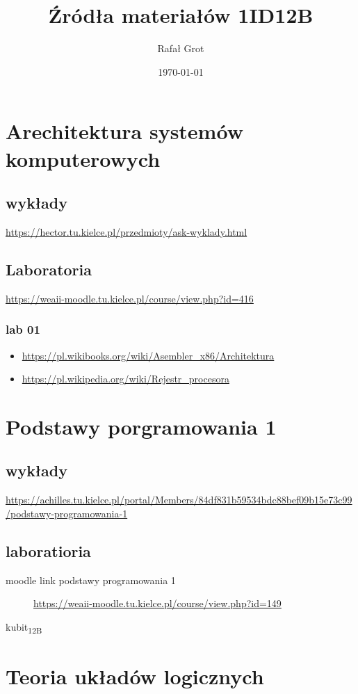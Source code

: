 \documentclass[11pt]{article}
\author{Rafał Grot}
\date{\today}
\title{Źródła materiałów 1ID12B}
\begin{document}
\maketitle
\tableofcontents


\section{Arechitektura systemów komputerowych}
\label{sec:org2bbe695}
\subsection{wykłady}
\label{sec:org91ddef0}
\url{https://hector.tu.kielce.pl/przedmioty/ask-wyklady.html}
\subsection{Laboratoria}
\label{sec:org96cab7e}
\url{https://weaii-moodle.tu.kielce.pl/course/view.php?id=416}
\subsubsection{lab 01}
\label{sec:org6049d85}
\begin{itemize}
\item \url{https://pl.wikibooks.org/wiki/Asembler\_x86/Architektura}
\item \url{https://pl.wikipedia.org/wiki/Rejestr\_procesora}
\end{itemize}
\section{Podstawy porgramowania 1}
\label{sec:orgda0dba5}
\subsection{wykłady}
\label{sec:orgf3ebb96}
\url{https://achilles.tu.kielce.pl/portal/Members/84df831b59534bdc88bef09b15e73c99/podstawy-programowania-1}
\subsection{laboratioria}
\label{sec:orgf40f60c}
\begin{description}
\item[{moodle link podstawy programowania 1}] \url{https://weaii-moodle.tu.kielce.pl/course/view.php?id=149}
\end{description}
kubit\textsubscript{12B}
\section{Teoria układów logicznych}
\label{sec:org010a4d7}
\end{document}
